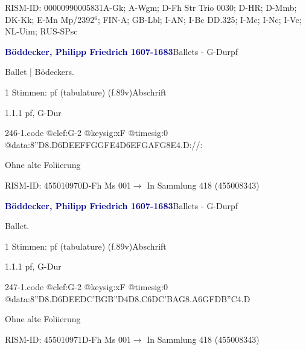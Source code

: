 \documentclass[twocolumn, 12pt]{book}
\begin{document}
\par RISM-ID: 00000990005831\newline A-Gk; A-Wgm; D-Fh  Str Trio 0030; D-HR; D-Mmb; DK-Kk; E-Mn  Mp/2392$^6$; FIN-A; GB-Lbl; I-AN; I-Bc  DD.325; I-Mc; I-Nc; I-Vc; NL-Uim; RUS-SPsc
\par \vspace{16pt} \textcolor{darkblue}{\textbf{Böddecker, Philipp Friedrich  1607-1683}}\hfillplus{\textbf{[246]}}\newline Ballets - G-Dur\newline pf
\par \begin{itshape}[f.89v, at left:] Ballet | Bödeckers.\end{itshape} 
\par \textcolor{darkblue}{}  1 Stimmen: pf (tabulature)  (f.89v)\newline Abschrift
\par 1.1.1  pf, G-Dur  
\begin{filecontents*}{246-1.code}
@clef:G-2
@keysig:xF
@timesig:0
@data:8''D{8.D6D}{EEFF}{GGFE}4D{6EFGA}{FG8E}4.D://:
\end{filecontents*}
\newline %
\par Ohne alte Foliierung
\par RISM-ID: 455010970\newline D-Fh  Ms 001\newline $\rightarrow$ In Sammlung 418 (455008343)
      
\par \vspace{16pt} \textcolor{darkblue}{\textbf{Böddecker, Philipp Friedrich  1607-1683}}\hfillplus{\textbf{[247]}}\newline Ballets - G-Dur\newline pf
\par \begin{itshape}[f.89v, at left:] Ballet.\end{itshape} 
\par \textcolor{darkblue}{}  1 Stimmen: pf (tabulature)  (f.89v)\newline Abschrift
\par 1.1.1  pf, G-Dur  
\begin{filecontents*}{247-1.code}
@clef:G-2
@keysig:xF
@timesig:0
@data:8''D{8.D6D}{EEDC}{'BGB''D}4D{8.C6D}{C'BAG}{8.A6G}{FDB''C}4.D
\end{filecontents*}
\newline %
\par Ohne alte Foliierung
\par RISM-ID: 455010971\newline D-Fh  Ms 001\newline $\rightarrow$ In Sammlung 418 (455008343)
      
\end{document}
